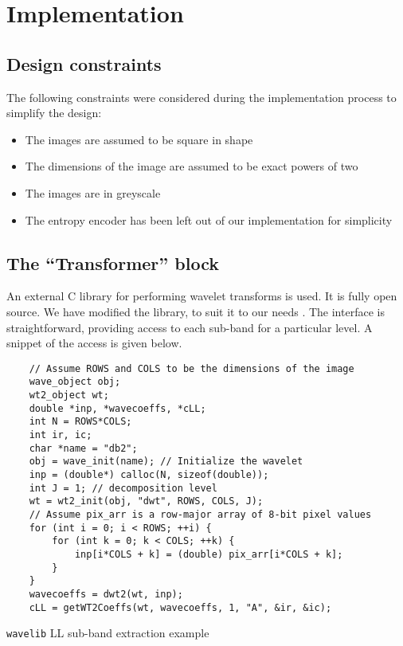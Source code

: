 \documentclass[./A14_Report.tex]{subfiles}
\begin{document}
\chapter{Implementation}

\section{Design constraints}
The following constraints were considered during the implementation process to
simplify the design:
\begin{itemize}
    \item The images are assumed to be square in shape
    \item The dimensions of the image are assumed to be exact powers of two
    \item The images are in greyscale
    \item The entropy encoder has been left out of our implementation for simplicity
\end{itemize}

\section{The ``Transformer'' block}

An external C library for performing wavelet transforms is used. It is fully
open source. We have modified the library, to suit it to our needs
\cite{rpwavelib}. The interface is straightforward, providing access to each
sub-band for a particular level. A snippet of the access is given below.

\begin{code}
    \begin{verbatim}
    // Assume ROWS and COLS to be the dimensions of the image
    wave_object obj;
    wt2_object wt;
    double *inp, *wavecoeffs, *cLL;
    int N = ROWS*COLS;
    int ir, ic;
    char *name = "db2";
    obj = wave_init(name); // Initialize the wavelet
    inp = (double*) calloc(N, sizeof(double));
    int J = 1; // decomposition level
    wt = wt2_init(obj, "dwt", ROWS, COLS, J);
    // Assume pix_arr is a row-major array of 8-bit pixel values
    for (int i = 0; i < ROWS; ++i) {
        for (int k = 0; k < COLS; ++k) {
            inp[i*COLS + k] = (double) pix_arr[i*COLS + k];
        }
    }
    wavecoeffs = dwt2(wt, inp);
    cLL = getWT2Coeffs(wt, wavecoeffs, 1, "A", &ir, &ic);
    \end{verbatim}
    \caption{\texttt{wavelib} LL sub-band extraction example \cite{libezw}}
    \label{code:wavelibex}
\end{code}
\end{document}
